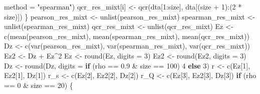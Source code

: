 \documentclass[
]{article}
\newenvironment{Shaded}{\begin{snugshade}}{\end{snugshade}}
\newcommand{\AttributeTok}[1]{\textcolor[rgb]{0.77,0.63,0.00}{#1}}
\newcommand{\ControlFlowTok}[1]{\textcolor[rgb]{0.13,0.29,0.53}{\textbf{#1}}}
\newcommand{\DecValTok}[1]{\textcolor[rgb]{0.00,0.00,0.81}{#1}}
\newcommand{\FloatTok}[1]{\textcolor[rgb]{0.00,0.00,0.81}{#1}}
\newcommand{\FunctionTok}[1]{\textcolor[rgb]{0.00,0.00,0.00}{#1}}
\newcommand{\NormalTok}[1]{#1}
\newcommand{\OtherTok}[1]{\textcolor[rgb]{0.56,0.35,0.01}{#1}}
\newcommand{\SpecialCharTok}[1]{\textcolor[rgb]{0.00,0.00,0.00}{#1}}
\newcommand{\StringTok}[1]{\textcolor[rgb]{0.31,0.60,0.02}{#1}}
\begin{document}
\begin{Shaded}
\begin{Highlighting}[]
                \AttributeTok{method =} \StringTok{"spearman"}\NormalTok{)}
\NormalTok{            qcr\_res\_mixt[i] }\OtherTok{\textless{}{-}} \FunctionTok{qcr}\NormalTok{(dta[}\DecValTok{1}\SpecialCharTok{:}\NormalTok{size], dta[(size }\SpecialCharTok{+} \DecValTok{1}\NormalTok{)}\SpecialCharTok{:}\NormalTok{(}\DecValTok{2} \SpecialCharTok{*}\NormalTok{ size)])}
\NormalTok{        \}}
\NormalTok{        pearson\_res\_mixt }\OtherTok{\textless{}{-}} \FunctionTok{unlist}\NormalTok{(pearson\_res\_mixt)}
\NormalTok{        spearman\_res\_mixt }\OtherTok{\textless{}{-}} \FunctionTok{unlist}\NormalTok{(spearman\_res\_mixt)}
\NormalTok{        qcr\_res\_mixt }\OtherTok{\textless{}{-}} \FunctionTok{unlist}\NormalTok{(qcr\_res\_mixt)}
\NormalTok{        Ez }\OtherTok{\textless{}{-}} \FunctionTok{c}\NormalTok{(}\FunctionTok{mean}\NormalTok{(pearson\_res\_mixt), }\FunctionTok{mean}\NormalTok{(spearman\_res\_mixt), }\FunctionTok{mean}\NormalTok{(qcr\_res\_mixt))}
\NormalTok{        Dz }\OtherTok{\textless{}{-}} \FunctionTok{c}\NormalTok{(}\FunctionTok{var}\NormalTok{(pearson\_res\_mixt), }\FunctionTok{var}\NormalTok{(spearman\_res\_mixt), }\FunctionTok{var}\NormalTok{(qcr\_res\_mixt))}
\NormalTok{        Ez2 }\OtherTok{\textless{}{-}}\NormalTok{ Dz }\SpecialCharTok{+}\NormalTok{ Ez}\SpecialCharTok{\^{}}\DecValTok{2}
\NormalTok{        Ez }\OtherTok{\textless{}{-}} \FunctionTok{round}\NormalTok{(Ez, }\AttributeTok{digits =} \DecValTok{3}\NormalTok{)}
\NormalTok{        Ez2 }\OtherTok{\textless{}{-}} \FunctionTok{round}\NormalTok{(Ez2, }\AttributeTok{digits =} \DecValTok{3}\NormalTok{)}
\NormalTok{        Dz }\OtherTok{\textless{}{-}} \FunctionTok{round}\NormalTok{(Dz, }\AttributeTok{digits =} \ControlFlowTok{if}\NormalTok{ (rho }\SpecialCharTok{==} \FloatTok{0.9} \SpecialCharTok{\&}\NormalTok{ size }\SpecialCharTok{==} \DecValTok{100}\NormalTok{) }\DecValTok{4} \ControlFlowTok{else} \DecValTok{3}\NormalTok{)}
\NormalTok{        r }\OtherTok{\textless{}{-}} \FunctionTok{c}\NormalTok{(Ez[}\DecValTok{1}\NormalTok{], Ez2[}\DecValTok{1}\NormalTok{], Dz[}\DecValTok{1}\NormalTok{])}
\NormalTok{        r\_s }\OtherTok{\textless{}{-}} \FunctionTok{c}\NormalTok{(Ez[}\DecValTok{2}\NormalTok{], Ez2[}\DecValTok{2}\NormalTok{], Dz[}\DecValTok{2}\NormalTok{])}
\NormalTok{        r\_Q }\OtherTok{\textless{}{-}} \FunctionTok{c}\NormalTok{(Ez[}\DecValTok{3}\NormalTok{], Ez2[}\DecValTok{3}\NormalTok{], Dz[}\DecValTok{3}\NormalTok{])}
        \ControlFlowTok{if}\NormalTok{ (rho }\SpecialCharTok{==} \DecValTok{0} \SpecialCharTok{\&}\NormalTok{ size }\SpecialCharTok{==} \DecValTok{20}\NormalTok{) \{}

\end{Highlighting}
\end{Shaded}
\end{document}
